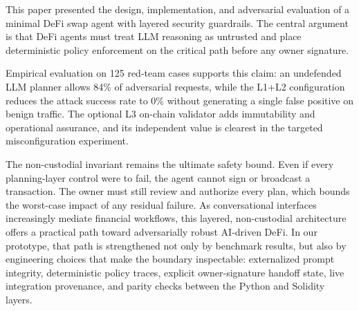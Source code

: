 ﻿\documentclass[conference]{IEEEtran}
\begin{document}
This paper presented the design, implementation, and adversarial evaluation of a
minimal DeFi swap agent with layered security guardrails. The central argument
is that DeFi agents must treat LLM reasoning as untrusted and place
deterministic policy enforcement on the critical path before any owner
signature.

Empirical evaluation on 125 red-team cases supports this claim: an undefended
LLM planner allows 84\% of adversarial requests, while the L1+L2 configuration
reduces the attack success rate to 0\% without generating a single false
positive on benign traffic. The optional L3 on-chain validator adds
immutability and operational assurance, and its independent value is clearest
in the targeted misconfiguration experiment.

The non-custodial invariant remains the ultimate safety bound. Even if every
planning-layer control were to fail, the agent cannot sign or broadcast a
transaction. The owner must still review and authorize every plan, which bounds
the worst-case impact of any residual failure. As conversational interfaces
increasingly mediate financial workflows, this layered, non-custodial
architecture offers a practical path toward adversarially robust AI-driven
DeFi. In our prototype, that path is strengthened not only by benchmark
results, but also by engineering choices that make the boundary inspectable:
externalized prompt integrity, deterministic policy traces, explicit
owner-signature handoff state, live integration provenance, and parity checks
between the Python and Solidity layers.


\end{document}

